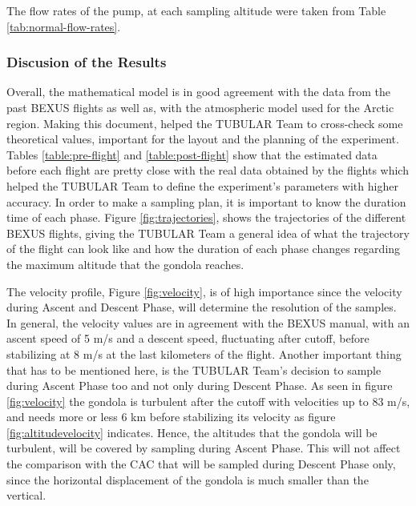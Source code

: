 \documentclass[a4paper,12pt,oneside]{article}
\begin{document}
\begin{appendices}
The flow rates of the pump, at each sampling altitude were taken from Table \ref{tab:normal-flow-rates}.




\subsubsection{Discusion of the Results}
Overall, the mathematical model is in good agreement with the data from the past BEXUS flights as well as, with the atmospheric model used for the Arctic region.
Making this document, helped the TUBULAR Team to cross-check some theoretical values, important for the layout and the planning of the experiment. Tables \ref{table:pre-flight} and \ref{table:post-flight} show that the estimated data before each flight are pretty close with the real data obtained by the flights which helped the TUBULAR Team to define the experiment's parameters with higher accuracy. 
In order to make a sampling plan, it is important to know the duration time of each phase. Figure \ref{fig:trajectories}, shows the trajectories of the different BEXUS flights, giving the TUBULAR Team a general idea of what the trajectory of the flight can look like and how the duration of each phase changes regarding the maximum altitude that the gondola reaches.

The velocity profile, Figure \ref{fig:velocity}, is of high importance since the velocity during Ascent and Descent Phase, will determine the resolution of the samples. In general, the velocity values are in agreement with the BEXUS manual, with an ascent speed of 5 m/s and a descent speed, fluctuating after cutoff, before stabilizing at 8 m/s at the last kilometers of the flight. Another important thing that has to be mentioned here, is the TUBULAR Team's decision to sample during Ascent Phase too and not only during Descent Phase. As seen in figure \ref{fig:velocity} the gondola is turbulent after the cutoff with velocities up to 83 m/s, and needs more or less 6 km before stabilizing its velocity as figure \ref{fig:altitudevelocity} indicates. Hence, the altitudes that the gondola will be turbulent, will be covered by sampling during Ascent Phase. This will not affect the comparison with the CAC that will be sampled during Descent Phase only, since the horizontal displacement of the gondola is much smaller than the vertical. 


\end{appendices}
\end{document}
